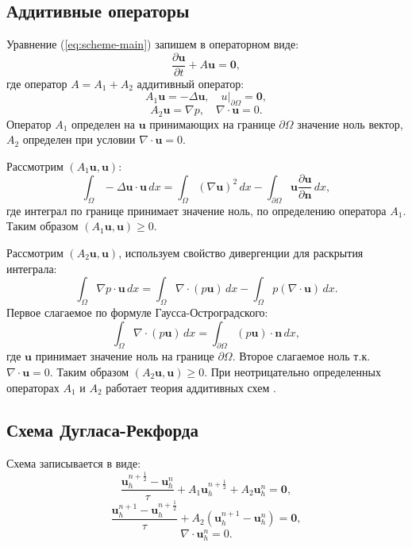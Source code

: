\documentclass[12pt]{article}
\begin{document}
\subsection{Аддитивные операторы}
Уравнение (\ref{eq:scheme-main}) запишем в операторном виде:
$$
\frac{\partial {\bm u}}{\partial t} + A {\bm u} = {\bm 0},
$$
где оператор $A=A_1 + A_2$ аддитивный оператор:
$$A_1 {\bm u} = - \Delta {\bm u}, \quad u|_{\partial \Omega} = {\bm 0},$$
$$A_2 {\bm u} = \nabla p, \quad \nabla \cdot {\bm u} = 0.$$
Оператор $A_1$ определен на ${\bm u}$ принимающих на границе $\partial \Omega$ значение ноль вектор, $A_2$ определен при условии $\nabla \cdot {\bm u} = 0.$

Рассмотрим $(A_1 {\bm u}, {\bm u})$:
$$
\int_{\Omega} -\Delta {\bm u} \cdot {\bm u} \, dx = \int_{\Omega} (\nabla {\bm u})^2 \, dx - \int_{\partial \Omega} {\bm u} \frac{\partial {\bm u}}{\partial {\bm n}} \, dx,
$$
где интеграл по границе принимает значение ноль, по определению оператора $A_1$. Таким образом $(A_1 {\bm u}, {\bm u}) \geq 0$.

Рассмотрим  $(A_2 {\bm u}, {\bm u})$, используем свойство дивергенции для раскрытия интеграла:
$$
\int_{\Omega} \nabla p \cdot {\bm u} \, dx = \int_{\Omega} \nabla \cdot (p{\bm u}) \, dx - \int_{\Omega} p (\nabla \cdot {\bm u}) \, dx.
$$
Первое слагаемое по формуле Гаусса-Остроградского:
$$
\int_{\Omega} \nabla \cdot (p{\bm u}) \, dx = \int_{\partial \Omega} (p{\bm u}) \cdot {\bm n} \, dx,
$$ 
где ${\bm u}$ принимает значение ноль на границе $\partial \Omega$. Второе слагаемое ноль т.к. $\nabla \cdot {\bm u} = 0$. Таким образом $(A_2 {\bm u}, {\bm u}) \geq 0$.
При неотрицательно определенных операторах $A_1$ и $A_2$ работает теория аддитивных схем \cite{vabishchevich-1999}.

\subsection{Схема Дугласа-Рекфорда}
Схема записывается в виде:
\begin{equation} \label{eq:scheme-douglas-1}
\frac{{\bm u}_h^{n + \frac{1}{2}} - {\bm u}_h^n}{\tau} + A_1 {\bm u}_h^{n + \frac{1}{2}}+A_2 {\bm u}_h^n={\bm 0},
\end{equation}
\begin{equation} \label{eq:scheme-douglas-2}
\frac{{\bm u}_h^{n+1}-{\bm u}_h^{n + \frac{1}{2}}}{\tau} + A_2 ({\bm u}_h^{n+1} - {\bm u}_h^{n} )={\bm 0},
\end{equation}
\begin{equation} \label{eq:scheme-douglas-3}
\nabla \cdot {\bm u}_h^n = 0.
\end{equation}
\end{document}
